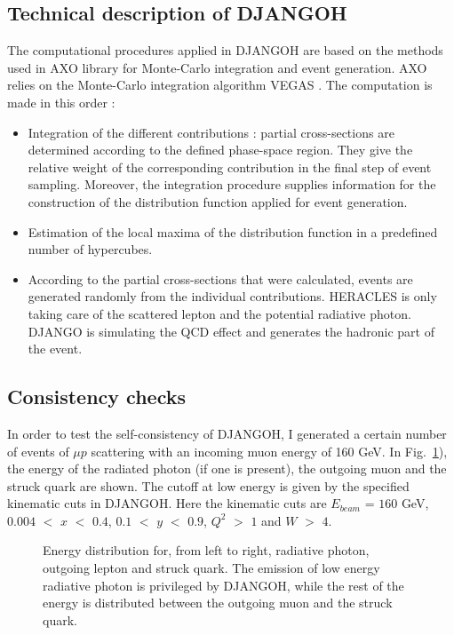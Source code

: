 \subsection{Technical description of DJANGOH}

The computational procedures applied in DJANGOH are based on the methods used in AXO \cite{AXO} library for Monte-Carlo integration and event generation. AXO relies on the Monte-Carlo integration algorithm VEGAS \cite{VEGAS}. The computation is made in this order :

\begin{itemize}
\item Integration of the different contributions : partial cross-sections are determined according to the defined phase-space region. They give the relative weight of the corresponding contribution in the final step of event sampling. Moreover, the integration procedure supplies information for the construction of the distribution function applied for event generation.
\item Estimation of the local maxima of the distribution function in a predefined number of hypercubes.
\item According to the partial cross-sections that were calculated, events are generated randomly from the individual contributions. HERACLES is only taking care of the scattered lepton and the potential radiative photon. DJANGO is simulating the QCD effect and generates the hadronic part of the event.
\end{itemize}

\subsection{Consistency checks}

In order to test the self-consistency of DJANGOH, I generated a certain number of events of $\mu p$ scattering with an incoming muon energy of 160 GeV. In Fig.~\ref{fig:edist}), the energy of the radiated photon (if one is present), the outgoing muon and the struck quark are shown. The cutoff at low energy is given by the specified kinematic cuts in DJANGOH. Here the kinematic cuts are $E_{beam}$ = $160$ GeV, $0.004$ $<$ $x$ $<$ $0.4$, $0.1$ $<$ $y$ $<$ $0.9$, $Q^2$ $>$ $1$ and $W$ $>$ $4$.

\begin{figure}[htb]
\centerline{}
\caption{Energy distribution for, from left to right, radiative photon, outgoing lepton and struck quark. The emission of low energy radiative photon is privileged by DJANGOH, while the rest of the energy is distributed between the outgoing muon and the struck quark.} \label{fig:edist}
\end{figure}

